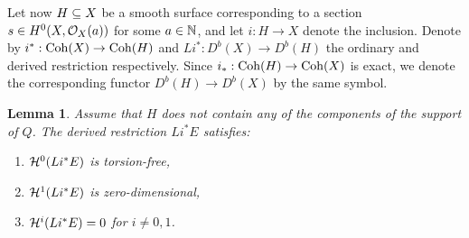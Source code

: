 \documentclass[letterpaper,12pt]{amsart}
\newtheorem{lem}[thm]{Lemma}
\theoremstyle{remark}
\begin{document}
Let now $H \subseteq X$ be a smooth surface corresponding to a section $s \in H^0(X, \mathcal{O}_X(a))$ for some $a \in \mathbb{N}$, and let $i: H \to X$ denote the inclusion. Denote by $i^*: \mathrm{Coh}(X) \to \mathrm{Coh}(H)$ and $Li^*: D^b(X) \to D^b(H)$ the ordinary and derived restriction respectively. Since $i_*: \mathrm{Coh}(H) \to \mathrm{Coh}(X)$ is exact, we denote the corresponding functor $D^b(H) \to D^b(X)$ by the same symbol.

\begin{lem}
Assume that $H$ does not contain any of the components of the support of $Q$. The derived restriction $L i^* E$ satisfies:
\begin{enumerate}[(i')]
    \item $\mathcal{H}^0(L i^* E)$ is torsion-free,
    \item $\mathcal{H}^1(L i^* E)$ is zero-dimensional,
    \item $\mathcal{H}^i(L i^* E) = 0$ for $i \neq 0, 1$. 
\end{enumerate}
\end{lem}
\end{document}
